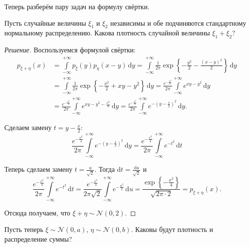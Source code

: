 Теперь разберём пару задач на формулу свёртки.
\begin{problem}
	Пусть случайные величины \(\xi_1\) и \(\xi_2\) независимы и обе подчиняются стандартному нормальному распределению. Какова плотность случайной величины \(\xi_1 + \xi_2\)?
\end{problem}
\begin{proof}[Решение]
	Воспользуемся формулой свёртки:
	\begin{align}
		p_{\xi + \eta}(x) &= \int\limits_{-\infty}^{+\infty} p_{\xi}(y) p_{\eta}(x - y)\,\mathrm{d}y = \int\limits_{-\infty}^{+\infty} \frac{1}{2\pi}\exp\left\{-\frac{y^2}{2} - \frac{(x - y)^2}{2}\right\}\,\mathrm{d}y \\
		&= \int\limits_{-\infty}^{+\infty} \frac{1}{2\pi}\exp\left\{-\frac{x^2}{2} + xy - y^2\right\}\,\mathrm{d}y = \frac{e^{-\frac{x^2}{2}}}{2\pi}\int\limits_{-\infty}^{+\infty} e^{xy - y^2}\,\mathrm{d}y \\
		&= \frac{e^{-\frac{x^2}{4}}}{2\pi}\int\limits_{-\infty}^{+\infty} e^{xy - y^2 - \frac{x^2}{4}}\,\mathrm{d}y = \frac{e^{-\frac{x^2}{4}}}{2\pi}\int\limits_{-\infty}^{+\infty} e^{-\left(y - \frac{x}{2}\right)^2}\,\mathrm{d}y.
	\end{align}
	
	Сделаем замену \(t = y - \frac{x}{2}\):
	\[
	\frac{e^{-\frac{x^2}{4}}}{2\pi}\int\limits_{-\infty}^{+\infty} e^{-\left(y - \frac{x}{2}\right)^2}\,\mathrm{d}y = \frac{e^{-\frac{x^2}{4}}}{2\pi}\int\limits_{-\infty}^{+\infty} e^{-t^2}\,\mathrm{d}t
	\]
	
	Теперь сделаем замену \(t = \frac{u}{\sqrt{2}}\). Тогда \(\mathrm{d}t = \frac{\mathrm{d}u}{\sqrt{2}}\) и
	\[
	\frac{e^{-\frac{x^2}{4}}}{2\pi}\int\limits_{-\infty}^{+\infty} e^{-t^2}\,\mathrm{d}t = \frac{e^{-\frac{x^2}{4}}}{2\pi\sqrt{2}}\int\limits_{-\infty}^{+\infty} e^{-\frac{u^2}{2}}\,\mathrm{d}u = \frac{\exp\left\{-\frac{x^2}{4}\right\}}{\sqrt{2\pi \cdot 2}} = p_{\xi + \eta}(x).
	\]
	
	Отсюда получаем, что \(\xi + \eta \sim \mathcal{N}(0, 2)\).
\end{proof}
\begin{exercise}
	Пусть теперь \(\xi \sim \mathcal{N}(0, a)\), \(\eta \sim \mathcal{N}(0, b)\). Каковы будут плотность и распределение суммы? 
\end{exercise}

